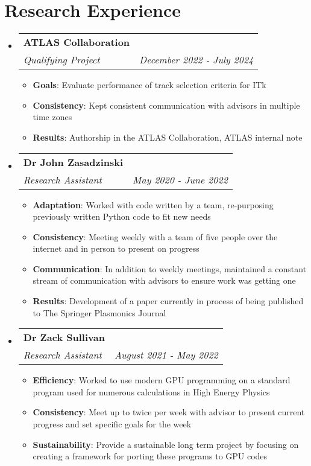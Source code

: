 \documentclass[a4paper,20pt]{article}
\makeatletter
\newcommand{\resumeItem}[2]{
  \item\small{
    \textbf{#1}{: #2 \vspace{-2pt}}
  }
}
\newcommand{\resumeSubheading}[4]{
  \vspace{-1pt}\item
    \begin{tabular*}{0.97\textwidth}{l@{\extracolsep{\fill}}r}
      \textbf{#1} & #2 \\
      \textit{#3} & \textit{#4} \\
    \end{tabular*}\vspace{-5pt}
}
\newcommand{\resumeSubHeadingListStart}{\begin{itemize}[leftmargin=*]}
\newcommand{\resumeSubHeadingListEnd}{\end{itemize}}
\newcommand{\resumeItemListStart}{\begin{itemize}}
\newcommand{\resumeItemListEnd}{\end{itemize}\vspace{-5pt}}
\makeatother
\begin{document}
\section{Research Experience}
\resumeSubHeadingListStart
\resumeSubheading{ATLAS Collaboration}{}
{Qualifying Project}{December 2022 - July 2024}
\resumeItemListStart
\resumeItem{Goals}{Evaluate performance of track selection criteria for ITk}
\resumeItem{Consistency}{Kept consistent communication with advisors in multiple time zones}
\resumeItem{Results}{Authorship in the ATLAS Collaboration, ATLAS internal note}\vspace{0.2cm}
\resumeItemListEnd
\vspace{-5pt}
\resumeSubheading{Dr John Zasadzinski}{}
{Research Assistant}{May 2020 - June 2022}
\resumeItemListStart
\resumeItem{Adaptation}{Worked with code written by a team, re-purposing previously written Python code to fit new needs}
\resumeItem{Consistency}{Meeting weekly with a team of five people over the internet and in person to present on progress}
\resumeItem{Communication}{In addition to weekly meetings, maintained a constant stream of communication with advisors to ensure work was getting one}
\resumeItem{Results}{Development of a paper currently in process of being published to The Springer Plasmonics Journal}
\vspace{0.2cm}
\resumeItemListEnd
\vspace{-5pt}
\resumeSubheading{Dr Zack Sullivan}{}
{Research Assistant}{August 2021 -  May 2022}
\resumeItemListStart
\resumeItem{Efficiency}{Worked to use modern GPU programming on a standard program used for numerous calculations in High Energy Physics}
\resumeItem{Consistency}{Meet up to twice per week with advisor to present current progress and set specific goals for the week}
\resumeItem{Sustainability}{Provide a sustainable long term project by focusing on creating a framework for porting these programs to GPU codes }
\resumeItemListEnd
\resumeSubHeadingListEnd

\vspace{-5pt}
\end{document}

